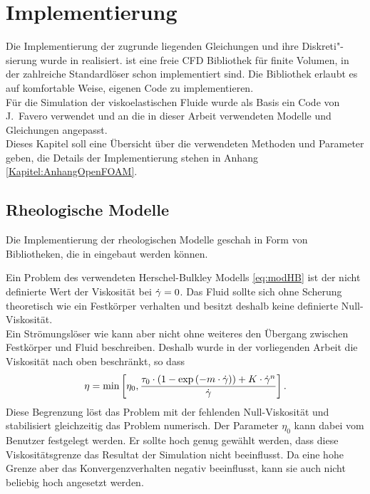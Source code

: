 \section{Implementierung}
\label{Kapitel:Implementierung}
Die Implementierung der zugrunde liegenden Gleichungen und ihre Diskreti"-sierung wurde in \openfoam{} \cite{openfoam} realisiert.
\openfoam{} ist eine freie CFD Bibliothek für finite Volumen, in der zahlreiche Standardlöser schon implementiert sind. Die Bibliothek erlaubt es auf komfortable Weise, eigenen Code zu implementieren.\\
Für die Simulation der viskoelastischen Fluide wurde als Basis ein Code von J.~Favero \cite{faveroOF} verwendet und an die in dieser Arbeit verwendeten Modelle und Gleichungen angepasst.\\
Dieses Kapitel soll eine Übersicht über die verwendeten Methoden und Parameter geben, die Details der Implementierung stehen in Anhang \ref{Kapitel:AnhangOpenFOAM}.

\subsection{Rheologische Modelle}
Die Implementierung der rheologischen Modelle geschah in Form von Bi\-blio\-the\-ken, die in \openfoam{} eingebaut werden können.

Ein Problem des verwendeten Herschel-Bulkley Modells \eqref{eq:modHB} ist der nicht definierte Wert der Viskosität bei $\dot\gamma=0$.
Das Fluid sollte sich ohne Scherung theoretisch wie ein Festkörper verhalten und besitzt deshalb keine definierte Null-Viskosität.\\
Ein Strömungslöser wie \openfoam{} kann aber nicht ohne weiteres den Übergang zwischen Festkörper und Fluid beschreiben. Deshalb wurde in der vorliegenden Arbeit die Viskosität nach oben beschränkt, so dass
%
\begin{equation}
    \eta = \min \left[ \eta_0, \frac{\tau_0\cdot\left(1-\exp\left( -m\cdot\dot\gamma \right)\right)+K\cdot \dot\gamma^n}{\dot\gamma} \right].
\end{equation}
%
Diese Begrenzung löst das Problem mit der fehlenden Null-Viskosität und stabilisiert gleichzeitig das Problem numerisch. Der Parameter $\eta_0$ kann dabei vom Benutzer festgelegt werden. Er sollte hoch genug gewählt werden, dass diese Viskositätsgrenze das Resultat der Simulation nicht beeinflusst. Da eine hohe Grenze aber das Konvergenzverhalten negativ beeinflusst, kann sie auch nicht beliebig hoch angesetzt werden.

